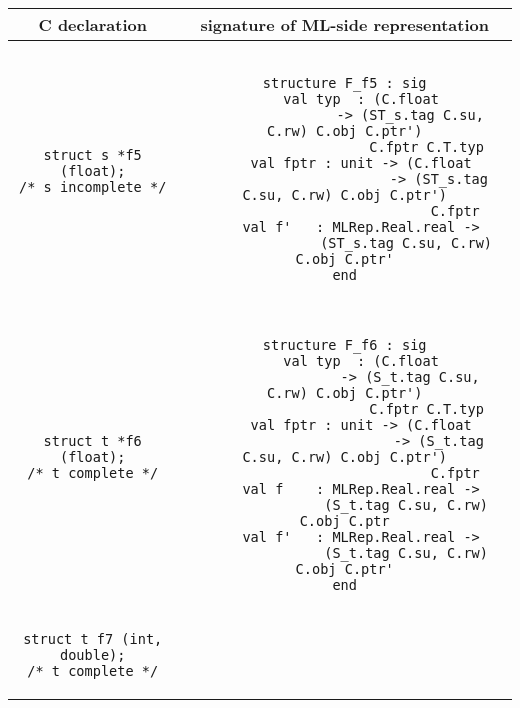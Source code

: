 \documentclass[titlepage,letterpaper]{article}
\begin{document}
\begin{small}
\begin{center}
\begin{tabular}{c|c}
C declaration & signature of ML-side representation \\ \hline\hline
\begin{minipage}{2in}
\begin{verbatim}
struct s *f5 (float);
/* s incomplete */
\end{verbatim}
\end{minipage}
&
\begin{minipage}{4in}
\begin{verbatim}

structure F_f5 : sig
    val typ  : (C.float
                -> (ST_s.tag C.su, C.rw) C.obj C.ptr')
                    C.fptr C.T.typ
    val fptr : unit -> (C.float
                       -> (ST_s.tag C.su, C.rw) C.obj C.ptr')
                           C.fptr
    val f'   : MLRep.Real.real ->
               (ST_s.tag C.su, C.rw) C.obj C.ptr'
end

\end{verbatim}
\end{minipage}
\\ \hline
\begin{minipage}{2in}
\begin{verbatim}
struct t *f6 (float);
/* t complete */
\end{verbatim}
\end{minipage}
&
\begin{minipage}{4in}
\begin{verbatim}

structure F_f6 : sig
    val typ  : (C.float
                -> (S_t.tag C.su, C.rw) C.obj C.ptr')
                    C.fptr C.T.typ
    val fptr : unit -> (C.float
                       -> (S_t.tag C.su, C.rw) C.obj C.ptr')
                           C.fptr
    val f    : MLRep.Real.real ->
               (S_t.tag C.su, C.rw) C.obj C.ptr
    val f'   : MLRep.Real.real ->
               (S_t.tag C.su, C.rw) C.obj C.ptr'
end

\end{verbatim}
\end{minipage}
\\ \hline
\begin{minipage}{2in}
\begin{verbatim}
struct t f7 (int, double);
/* t complete */
\end{verbatim}
\end{minipage}
&
\begin{minipage}{4in}
\begin{verbatim}


\end{verbatim}
\end{minipage}
\end{tabular}
\end{center}
\end{small}
\end{document}
